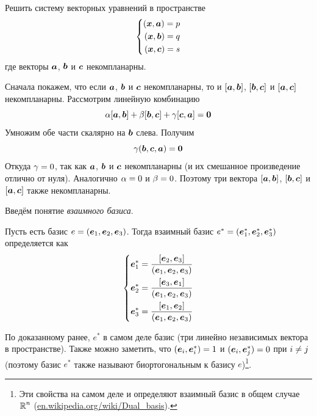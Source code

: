 \documentclass[a4paper,12pt]{article}
\begin{document}
  
  \begin{problem}[3.31]
    Решить систему векторных уравнений в пространстве
    \[
      \left\{
        \begin{aligned}
          (\boldsymbol x, \boldsymbol a) = p\\
          (\boldsymbol x, \boldsymbol b) = q\\
          (\boldsymbol x, \boldsymbol c) = s
        \end{aligned}
      \right.
    \]
    где векторы $\boldsymbol a$, $\boldsymbol b$ и $\boldsymbol c$ некомпланарны.
  \end{problem}
  
  \begin{solution}
    Сначала покажем, что если $\boldsymbol a$, $\boldsymbol b$ и $\boldsymbol c$ некомпланарны, то и $[\boldsymbol a, \boldsymbol b]$, $[\boldsymbol b, \boldsymbol c]$ и $[\boldsymbol a, \boldsymbol c]$ некомпланарны.
    Рассмотрим линейную комбинацию
    \[
      \alpha [\boldsymbol a, \boldsymbol b] + \beta [\boldsymbol b, \boldsymbol c] + \gamma [\boldsymbol c, \boldsymbol a] = \boldsymbol 0
    \]
    Умножим обе части скалярно на $\boldsymbol b$ слева.
    Получим
    \[
      \gamma (\boldsymbol b, \boldsymbol c, \boldsymbol a) = \boldsymbol 0
    \]
    Откуда $\gamma \hm= 0$, так как $\boldsymbol a$, $\boldsymbol b$ и $\boldsymbol c$ некомпланарны (и их смешанное произведение отлично от нуля).
    Аналогично $\alpha \hm= 0$ и $\beta \hm= 0$.
    Поэтому три вектора $[\boldsymbol a, \boldsymbol b]$, $[\boldsymbol b, \boldsymbol c]$ и $[\boldsymbol a, \boldsymbol c]$ также некомпланарны.
    
    \bigskip
    
    Введём понятие \emph{взаимного базиса}.
    
    \begin{definition}
      Пусть есть базис $e \hm= (\bds e_1, \bds e_2, \bds e_3)$.
      Тогда взаимный базис $e^* \hm= (\bds e_1^*, \bds e_2^*, \bds e_3^*)$ определяется как
      \begin{equation}\label{eq:dual-basis}
        \left\{
          \begin{aligned}
            &\boldsymbol e_1^* = \frac{[\boldsymbol e_2, \boldsymbol e_3]}{(\boldsymbol e_1, \boldsymbol e_2, \boldsymbol e_3)}\\
            &\boldsymbol e_2^* = \frac{[\boldsymbol e_3, \boldsymbol e_1]}{(\boldsymbol e_1, \boldsymbol e_2, \boldsymbol e_3)}\\
            &\boldsymbol e_3^* = \frac{[\boldsymbol e_1, \boldsymbol e_2]}{(\boldsymbol e_1, \boldsymbol e_2, \boldsymbol e_3)}
          \end{aligned}
        \right.
      \end{equation}
    \end{definition}
    
    По доказанному ранее, $e^*$ в самом деле базис (три линейно независимых вектора в пространстве).
    Также можно заметить, что $(\bds e_i, \bds e_i^*) \hm= 1$ и $(\bds e_i, \bds e_j^*) \hm= 0$ при $i \hm{\not=} j$ (поэтому базис $e^*$ также называют биортогональным к базису $e$)\footnote{Эти свойства на самом деле и определяют взаимный базис в общем случае $\operatorname{\mathbb R}^n$ (\href{https://en.wikipedia.org/wiki/Dual\_basis}{en.wikipedia.org/wiki/Dual\_basis}).}.
    

\end{solution}
\end{document}
